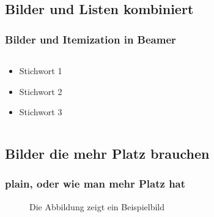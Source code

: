 \subsection{Bilder und Listen kombiniert} 

\begin{frame}
\frametitle{Bilder und Itemization in Beamer}
\begin{columns}
\begin{column}{5cm}
\begin{itemize}
\item<1-> Stichwort 1
\item<3-> Stichwort 2
\item<5-> Stichwort 3
\end{itemize}
\vspace{3cm} 
\end{column}
\begin{column}{5cm}
\begin{overprint}
\end{overprint}
\end{column}
\end{columns}
\end{frame}

\subsection{Bilder die mehr Platz brauchen} 
\begin{frame}[plain]
\frametitle{plain, oder wie man mehr Platz hat}
\begin{figure}
\caption{Die Abbildung zeigt ein Beispielbild}
\end{figure}
\end{frame}